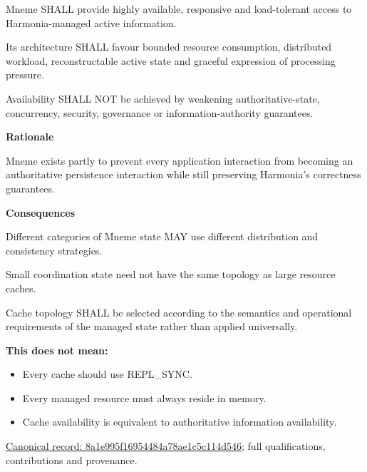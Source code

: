 Mneme SHALL provide highly available, responsive and load-tolerant
access to Harmonia-managed active information.



Its architecture SHALL favour bounded resource consumption, distributed
workload, reconstructable active state and graceful expression of
processing pressure.



Availability SHALL NOT be achieved by weakening authoritative-state,
concurrency, security, governance or information-authority guarantees.



\par\medskip\textbf{Rationale}\par


Mneme exists partly to prevent every application interaction from
becoming an authoritative persistence interaction while still preserving
Harmonia's correctness guarantees.



\par\medskip\textbf{Consequences}\par


Different categories of Mneme state MAY use different distribution and
consistency strategies.



Small coordination state need not have the same topology as large
resource caches.



Cache topology SHALL be selected according to the semantics and
operational requirements of the managed state rather than applied
universally.



\textbf{This does not mean:}



\begin{itemize}


\item Every cache should use REPL\_SYNC.

\item Every managed resource must always reside in memory.

\item Cache availability is equivalent to authoritative information availability.

\end{itemize}

{\footnotesize \href{../../../../continuum/motivation/principle/8a1e995f16954484a78ae1c5c114d546.md}{Canonical record: 8a1e995f16954484a78ae1c5c114d546}; full qualifications, contributions and provenance.}\par
